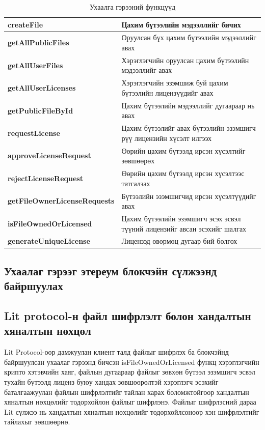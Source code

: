 \begin{table}[h!]
	\centering
   \begin{tabularx}{\textwidth}{|p{}|X|}
		\hline
		 \textbf{createFile}& Цахим бүтээлийн мэдээллийг бичих
	\\ \hline \textbf{getAllPublicFiles} & Оруулсан бүх цахим бүтээлийн мэдээллийг авах
	\\ \hline \textbf{getAllUserFiles} &  Хэрэглэгчийн оруулсан цахим бүтээлийн мэдээллийг авах
	\\ \hline \textbf{getAllUserLicenses} & Хэрэглэгчийн эзэмшиж буй цахим бүтээлийн лицензүүдийг авах
	\\ \hline \textbf{getPublicFileById} & Цахим бүтээлийн мэдээллийг дугаараар нь авах
	\\ \hline \textbf{requestLicense} & Цахим бүтээлийг авах бүтээлийн эзэмшигч рүү лицензийн хүсэлт илгээх
	\\ \hline \textbf{approveLicenseRequest} & Өөрийн цахим бүтээлд ирсэн хүсэлтийг зөвшөөрөх
	\\ \hline \textbf{rejectLicenseRequest} & Өөрийн цахим бүтээлд ирсэн хүсэлтээс татгалзах
	\\ \hline \textbf{getFileOwnerLicenseRequests} & Бүтээлийн эзэмшигчид ирсэн хүсэлтүүдийг авах
	\\ \hline \textbf{isFileOwnedOrLicensed} & Цахим бүтээлийн эзэмшигч эсэх эсвэл түүний лицензийг авсан эсэхийг шалгах
	\\ \hline \textbf{generateUniqueLicense} & Лицензэд өвөрмөц дугаар бий болгох                                                             \\ \hline
	\end{tabularx}
   \caption{Ухаалга гэрээний функцүүд}
\end{table}

\newpage
\subsection{Ухаалаг гэрээг этереум блокчэйн сүлжээнд байршуулах}


\subsection{Lit protocol-н файл шифрлэлт болон хандалтын хяналтын нөхцөл}
Lit Protocol-оор дамжуулан клиент талд файлыг шифрлэх ба блокчэйнд байршуулсан ухаалаг гэрээнд бичсэн isFileOwnedOrLicensed функц хэрэглэгчийн крипто хэтэвчийн хаяг, файлын дугаараар файлыг зөвхөн бүтээл эзэмшигч эсвэл тухайн бүтээлд лиценз буюу хандах зөвшөөрөлтэй хэрэглэгч эсэхийг баталгаажуулан файлын шифрлэлтийг тайлан харах боломжтойгоор хандалтын хяналтын нөхцөлийг тодорхойлон файлыг шифрлэнэ. Файлыг шифрлэсний дараа Lit сүлжээ нь хандалтын хяналтын нөхцөлийг тодорхойлсоноор хэн шифрлэлтийг тайлахыг зөвшөөрнө.

